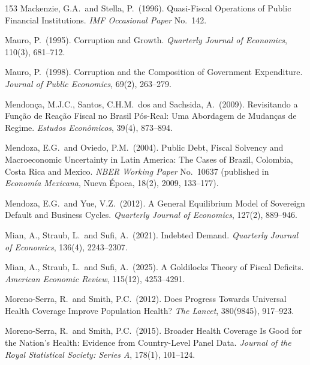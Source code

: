 \documentclass[11pt,a4paper]{article}
\begin{document}
\begin{thebibliography}{153}
 Mackenzie, G.A.\ and Stella, P.\ (1996). Quasi-Fiscal Operations of Public Financial Institutions. \textit{IMF Occasional Paper} No.\ 142.

 Mauro, P.\ (1995). Corruption and Growth. \textit{Quarterly Journal of Economics}, 110(3), 681--712.

 Mauro, P.\ (1998). Corruption and the Composition of Government Expenditure. \textit{Journal of Public Economics}, 69(2), 263--279.

 Mendon\c{c}a, M.J.C., Santos, C.H.M.\ dos and Sachsida, A.\ (2009). Revisitando a Fun\c{c}\~ao de Rea\c{c}\~ao Fiscal no Brasil P\'os-Real: Uma Abordagem de Mudan\c{c}as de Regime. \textit{Estudos Econ\^omicos}, 39(4), 873--894.

 Mendoza, E.G.\ and Oviedo, P.M.\ (2004). Public Debt, Fiscal Solvency and Macroeconomic Uncertainty in Latin America: The Cases of Brazil, Colombia, Costa Rica and Mexico. \textit{NBER Working Paper} No.\ 10637 (published in \textit{Econom\'ia Mexicana}, Nueva \'Epoca, 18(2), 2009, 133--177).

 Mendoza, E.G.\ and Yue, V.Z.\ (2012). A General Equilibrium Model of Sovereign Default and Business Cycles. \textit{Quarterly Journal of Economics}, 127(2), 889--946.

 Mian, A., Straub, L.\ and Sufi, A.\ (2021). Indebted Demand. \textit{Quarterly Journal of Economics}, 136(4), 2243--2307.

 Mian, A., Straub, L.\ and Sufi, A.\ (2025). A Goldilocks Theory of Fiscal Deficits. \textit{American Economic Review}, 115(12), 4253--4291.

 Moreno-Serra, R.\ and Smith, P.C.\ (2012). Does Progress Towards Universal Health Coverage Improve Population Health? \textit{The Lancet}, 380(9845), 917--923.

 Moreno-Serra, R.\ and Smith, P.C.\ (2015). Broader Health Coverage Is Good for the Nation's Health: Evidence from Country-Level Panel Data. \textit{Journal of the Royal Statistical Society: Series A}, 178(1), 101--124.


\end{thebibliography}
\end{document}
